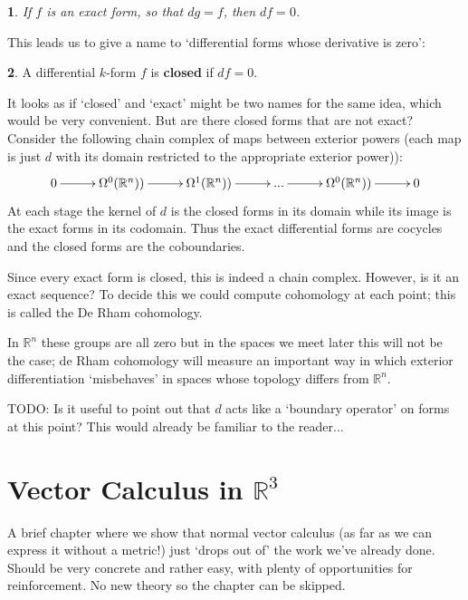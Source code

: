 \documentclass[oneside,english]{amsbook}
\numberwithin{section}{chapter}
\theoremstyle{plain}
\newtheorem{thm}{\protect\theoremname}
\theoremstyle{definition}
\newtheorem{defn}[thm]{\protect\definitionname}
\providecommand{\definitionname}{Definition}
\providecommand{\theoremname}{Theorem}
\begin{document}
			\begin{thm}
				If $f$ is an exact form, so that $dg = f$, then $df = 0$.
			\end{thm}
			
			This leads us to give a name to `differential forms whose derivative is zero':
			
			\begin{defn}
				A differential $k$-form $f$ is \textbf{closed} if $df = 0$. 
			\end{defn}
	
			It looks as if `closed' and `exact' might be two names for the same idea, which would be very convenient. But are there closed forms that are not exact? Consider the following chain complex of maps between exterior powers (each map is just $d$ with its domain restricted to the appropriate exterior power)):		
			\[ 
			\xymatrix@C+0.3em{
				0 \ar[r] & \Omega^0(\mathbb{R}^n))\ar[r] & \Omega^1(\mathbb{R}^n))\ar[r] & ... \ar[r] & \Omega^0(\mathbb{R}^n))\ar[r]  & 0
			}
			\]
			At each stage the kernel of $d$ is the closed forms in its domain while its image is the exact forms in its codomain. Thus the exact differential forms are cocycles and the closed forms are the coboundaries.
			
			Since every exact form is closed, this is indeed a chain complex. However, is it an exact sequence? To decide this we could compute cohomology at each point; this is called the De Rham cohomology. 
			
			In $\mathbb{R}^n$ these groups are all zero but in the spaces we meet later this will not be the case; de Rham cohomology will measure an important way in which exterior differentiation `misbehaves' in spaces whose topology differs from $\mathbb{R}^n$.

			TODO: Is it useful to point out that $d$ acts like a `boundary operator' on forms at this point? This would already be familiar to the reader...
			
	\chapter{Vector Calculus in $\mathbb{R}^3$}

		A brief chapter where we show that normal vector calculus (as far as we can express it without a metric!) just `drops out of' the work we've already done. Should be very concrete and rather easy, with plenty of opportunities for reinforcement. No new theory so the chapter can be skipped.
\end{document}
